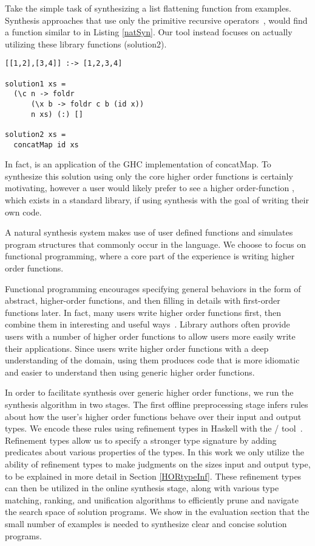 Take the simple task of synthesizing a list flattening function from examples. 
Synthesis approaches that use only the primitive recursive operators~\cite{Osera:2015,FeserCD15}, would find a function similar to  in Listing \ref{natSyn}.
Our tool instead focuses on actually utilizing these library functions (solution2).

\begin{lstlisting}[caption=Low-level synthesis vs. Natural synthesis,label=natSyn]
[[1,2],[3,4]] :-> [1,2,3,4]

solution1 xs = 
  (\c n -> foldr 
      (\x b -> foldr c b (id x))
      n xs) (:) []
      
solution2 xs =
  concatMap id xs
\end{lstlisting}

\noindent In fact,  is an application of the GHC\cite{ghc} implementation of concatMap. To synthesize this solution using only the core higher order functions is certainly motivating, however a user would likely prefer to see a higher order-function , which exists in a standard library, if using synthesis with the goal of writing their own code.

A natural synthesis system makes use of user defined functions and simulates program structures that commonly occur in the language.  
We choose to focus on functional programming, where a core part of the experience is writing higher order functions.  

Functional programming encourages specifying general behaviors in the form of abstract, higher-order functions, and then filling in details with first-order functions later.
In fact, many users write higher order functions first, then combine them in interesting and useful ways~\cite{Lipovaca:2011}.
Library authors often provide users with a number of higher order functions to allow users more easily write their applications.
Since users write higher order functions with a deep understanding of the domain, using them produces code that is more idiomatic and easier to understand then using generic higher order functions.

In order to facilitate synthesis over generic higher order functions, we run the synthesis algorithm in two stages. 
The first offline preprocessing stage infers rules about how the user's higher order functions behave over their input and output types.
We encode these rules using refinement types in Haskell with the \lhask/ tool~\cite{DBLP:conf/haskell/VazouSJ14}.
Refinement types allow us to specify a stronger type signature by adding predicates about various properties of the types.
In this work we only utilize the ability of refinement types to make judgments on the sizes input and output type, to be explained in more detail in Section \ref{HORtypeInf}.
These refinement types can then be utilized in the online synthesis stage, along with various type matching, ranking, and unification algorithms to efficiently prune and navigate the search space of solution programs.
We show in the evaluation section that the small number of examples is needed to synthesize clear and concise solution programs.

